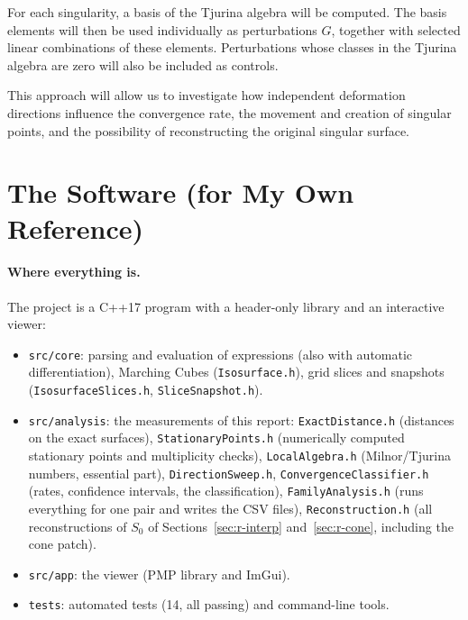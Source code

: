 \documentclass[12pt, a4paper]{article}
\theoremstyle{plain}
\theoremstyle{definition}
\theoremstyle{remark}
\theoremstyle{definition}
\begin{document}
For each singularity, a basis of the Tjurina algebra will be
computed. The basis elements will then be used individually
as perturbations $G$, together with selected linear
combinations of these elements. Perturbations whose classes
in the Tjurina algebra are zero will also be included as
controls.

This approach will allow us to investigate how independent
deformation directions influence the convergence rate,
the movement and creation of singular points, and the
possibility of reconstructing the original singular surface.

\appendix

\section{The Software (for My Own Reference)}
\label{sec:r-software}

\paragraph{Where everything is.} The project is a C++17 program with a header-only
library and an interactive viewer:
\begin{itemize}
    \item \texttt{src/core}: parsing and evaluation of expressions (also with automatic
          differentiation), Marching Cubes (\texttt{Isosurface.h}), grid slices and
          snapshots (\texttt{IsosurfaceSlices.h}, \texttt{SliceSnapshot.h}).
    \item \texttt{src/analysis}: the measurements of this report:
          \texttt{ExactDistance.h} (distances on the exact surfaces),
          \texttt{StationaryPoints.h} (numerically computed stationary points and multiplicity checks),
          \texttt{LocalAlgebra.h} (Milnor/Tjurina numbers, essential part),
          \texttt{DirectionSweep.h}, \texttt{ConvergenceClassifier.h} (rates,
          confidence intervals, the classification), \texttt{FamilyAnalysis.h}
          (runs everything for one pair and writes the CSV files),
          \texttt{Reconstruction.h} (all reconstructions of $S_0$ of
          Sections~\ref{sec:r-interp} and~\ref{sec:r-cone}, including the cone
          patch).
    \item \texttt{src/app}: the viewer (PMP library and ImGui).
    \item \texttt{tests}: automated tests (14, all passing) and command-line tools.
\end{itemize}
\end{document}

